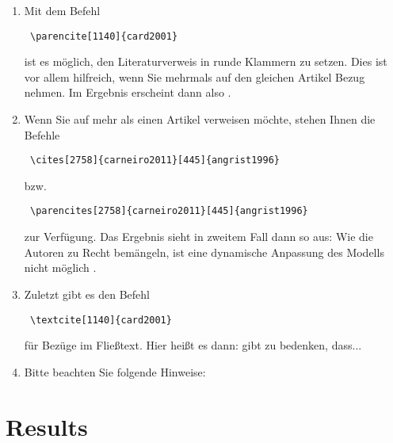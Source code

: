 \documentclass{scrbook}
\begin{document}
\begin{enumerate}
\item Mit dem Befehl \begin{verbatim} \parencite[1140]{card2001} \end{verbatim} ist es möglich, den Literaturverweis in runde Klammern zu setzen. Dies ist vor allem hilfreich, wenn Sie mehrmals auf den gleichen Artikel Bezug nehmen. Im Ergebnis erscheint dann also \parencite [vgl.][1140]{card2001}.\\

\item Wenn Sie auf mehr als einen Artikel verweisen  möchte, stehen Ihnen die Befehle \begin{verbatim} \cites[2758]{carneiro2011}[445]{angrist1996} \end{verbatim}  bzw. \begin{verbatim} \parencites[2758]{carneiro2011}[445]{angrist1996} \end{verbatim} zur Verfügung. Das Ergebnis sieht in zweitem Fall dann so aus: Wie die Autoren zu Recht bemängeln, ist eine dynamische Anpassung des Modells nicht möglich \parencites [2758]{carneiro2011}[445]{angrist1996}. 

\item Zuletzt gibt es den Befehl \begin{verbatim} \textcite[1140]{card2001} \end{verbatim} für Bezüge im Fließtext. Hier heißt es dann: \textcite[1140]{card2001} gibt zu bedenken, dass... \\

\item Bitte beachten Sie folgende Hinweise:
\end{enumerate}


\chapter{Results}
\end{document}
